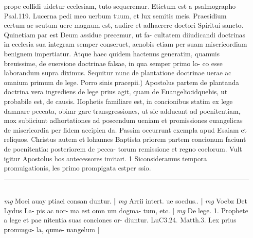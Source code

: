 \documentclass{article}
\begin{document}
\begin{pages}
prope collidi uidetur ecclesiam, tuto sequeremur. Etictum est a psalmographo Psal.119. Lucerna pedi meo uerbum tuum, et lux semitis meis. Praesidium certum ac scutum uere magnum est, audire et adhaerere doctori Spiritui sancto. Quinetiam par est Deum assidue precemur, ut fa- cultatem diiudicandi doctrinas in ecclesia sua integram semper conseruet, acnobis etiam per suam misericordiam benignem impertiatur. Atque haec quidem hactenus generatim, quamuis breuissime, de euersione doctrinae falsae, in qua semper primo lo- co esse laborandum supra diximus. Sequitur nunc de plantatione doctrinae uerae ac omnium primum de lege.  \pend\pstart Porro sinis pracepii.) Apostolus partem de plantanda doctrina vera ingrediens de lege prius agit, quam de Euangelio:idquehis, ut probabile est, de causis.  \pend{} IIophetis familiare est, in concionibus statim ex lege damnare peccata, obimr gare transgressiones, ut sic adducant ad poenitentiam, mox subiiciunt adhortationes ad poscendum ueniam et promissiones euangelicas de misericordia per fidem accipien da. Passim occurrunt exempla apud Esaiam et reliquos. Christus autem et lohannes Baptista priorem partem concionum faciunt de poenitentia: posteriorem de pecca- torum remissione et regno coelorum. Vult igitur Apostolus hos antecessores imitari. 1 Siconsideramus tempora promuigationis, les primo prompigata estper ssio.  \pend
\vspace{0.5cm}\noindent
\vspace{0.2cm}\rule{1cm}{0.2pt}\\ 
\hspace{0.2cm}\textit{mg}
\footnotesize Moei auay ptiaci consan duntur. 
\normalsize| 
\hspace{0.2cm}\textit{mg}
\footnotesize Arrii intert. ue soedus.. 
\normalsize| 
\hspace{0.2cm}\textit{mg}
\footnotesize Voebz Det Lydus La- pis ac nor- ma est omn um dogma- tum, etc. 
\normalsize| 
\hspace{0.2cm}\textit{mg}
\footnotesize De lege. 1. Prophete a lege et pae nitentia suas conciones or- diuntur. LuC3.24. Matth.3. Lex prius promuιgα- la, qume- uangelum 
\normalsize| 

\end{pages}
\end{document}

